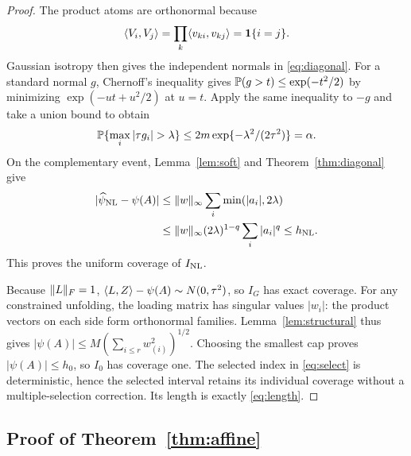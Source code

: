 \begin{proof}
The product atoms are orthonormal because
\[
 \langle V_i,V_j\rangle=\prod_k\langle v_{ki},v_{kj}\rangle=\mathbf1\{i=j\}.
\]
Gaussian isotropy then gives the independent normals in \eqref{eq:diagonal}. For a standard normal $g$, Chernoff's inequality gives $\mathbb P(g>t)\le\exp(-t^2/2)$ by minimizing $\exp(-ut+u^2/2)$ at $u=t$. Apply the same inequality to $-g$ and take a union bound to obtain
\[
 \PP\{\max_i|\tau g_i|>\lambda\}
 \le2m\exp\{-\lambda^2/(2\tau^2)\}=\alpha.
\]
On the complementary event, Lemma~\ref{lem:soft} and Theorem~\ref{thm:diagonal} give
\begin{align*}
 |\widehat\psi_{\mathrm{NL}}-\psi(A)|
 &\le\lVert w\rVert_\infty\sum_i\min(|a_i|,2\lambda)\\
 &\le\lVert w\rVert_\infty(2\lambda)^{1-q}\sum_i|a_i|^q\le h_{\mathrm{NL}}.
\end{align*}
This proves the uniform coverage of $I_{\mathrm{NL}}$.

Because $\lVert L\rVert_F=1$, $\langle L,Z\rangle-\psi(A)\sim N(0,\tau^2)$, so $I_G$ has exact coverage. For any constrained unfolding, the loading matrix has singular values $|w_i|$: the product vectors on each side form orthonormal families. Lemma~\ref{lem:structural} thus gives $|\psi(A)|\le M(\sum_{i\le r}w_{(i)}^2)^{1/2}$. Choosing the smallest cap proves $|\psi(A)|\le h_0$, so $I_0$ has coverage one. The selected index in \eqref{eq:select} is deterministic, hence the selected interval retains its individual coverage without a multiple-selection correction. Its length is exactly \eqref{eq:length}.
\end{proof}

\subsection{Proof of Theorem~\ref{thm:affine}}

